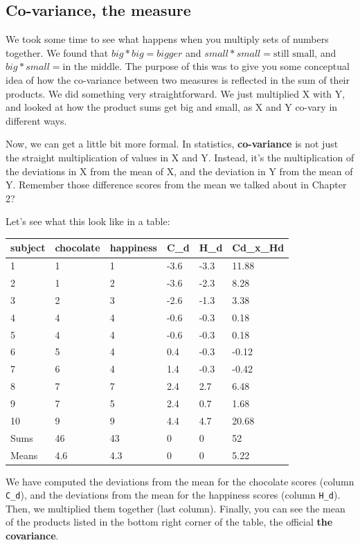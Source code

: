 \documentclass[
]{book}
\begin{document}
\subsection{Co-variance, the measure}\label{co-variance-the-measure}

We took some time to see what happens when you multiply sets of numbers together. We found that \(big*big = bigger\) and \(small*small=\text{still small}\), and \(big*small=\text{in the middle}\). The purpose of this was to give you some conceptual idea of how the co-variance between two measures is reflected in the sum of their products. We did something very straightforward. We just multiplied X with Y, and looked at how the product sums get big and small, as X and Y co-vary in different ways.

Now, we can get a little bit more formal. In statistics, \textbf{co-variance} is not just the straight multiplication of values in X and Y. Instead, it's the multiplication of the deviations in X from the mean of X, and the deviation in Y from the mean of Y. Remember those difference scores from the mean we talked about in Chapter 2?

Let's see what this look like in a table:

\begin{tabular}{l|l|l|l|l|l}
\hline
subject & chocolate & happiness & C\_d & H\_d & Cd\_x\_Hd\\
\hline
1 & 1 & 1 & -3.6 & -3.3 & 11.88\\
\hline
2 & 1 & 2 & -3.6 & -2.3 & 8.28\\
\hline
3 & 2 & 3 & -2.6 & -1.3 & 3.38\\
\hline
4 & 4 & 4 & -0.6 & -0.3 & 0.18\\
\hline
5 & 4 & 4 & -0.6 & -0.3 & 0.18\\
\hline
6 & 5 & 4 & 0.4 & -0.3 & -0.12\\
\hline
7 & 6 & 4 & 1.4 & -0.3 & -0.42\\
\hline
8 & 7 & 7 & 2.4 & 2.7 & 6.48\\
\hline
9 & 7 & 5 & 2.4 & 0.7 & 1.68\\
\hline
10 & 9 & 9 & 4.4 & 4.7 & 20.68\\
\hline
Sums & 46 & 43 & 0 & 0 & 52\\
\hline
Means & 4.6 & 4.3 & 0 & 0 & 5.22\\
\hline
\end{tabular}

We have computed the deviations from the mean for the chocolate scores (column \texttt{C\_d}), and the deviations from the mean for the happiness scores (column \texttt{H\_d}). Then, we multiplied them together (last column). Finally, you can see the mean of the products listed in the bottom right corner of the table, the official \textbf{the covariance}.
\end{document}
